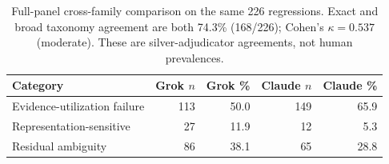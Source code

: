 \begin{table}[t]
\centering
\caption{Full-panel cross-family comparison on the same 226 regressions. Exact and broad taxonomy agreement are both 74.3\% (168/226); Cohen's $\kappa=0.537$ (moderate). These are silver-adjudicator agreements, not human prevalences.}
\label{tab:cross-family}
\begin{tabular}{lrrrr}
\toprule
Category & Grok $n$ & Grok \% & Claude $n$ & Claude \% \\
\midrule
Evidence-utilization failure & 113 & 50.0 & 149 & 65.9 \\
Representation-sensitive & 27 & 11.9 & 12 & 5.3 \\
Residual ambiguity & 86 & 38.1 & 65 & 28.8 \\
\bottomrule
\end{tabular}
\end{table}
